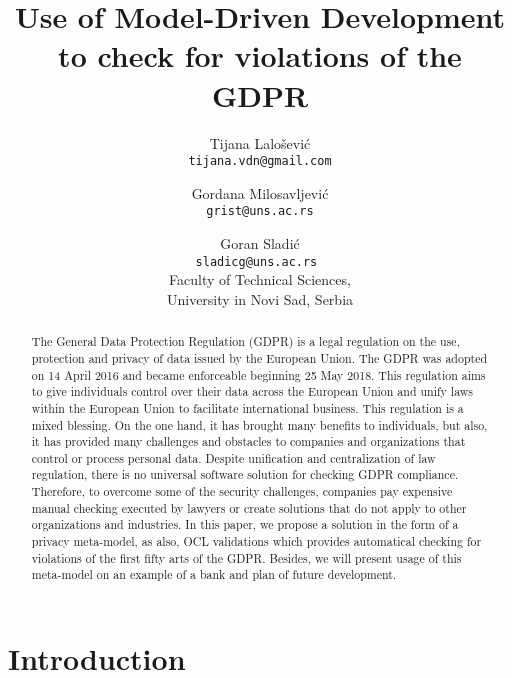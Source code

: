\documentclass[11pt,english]{article}
\begin{document}
\title{Use of Model-Driven Development to check for violations of the GDPR}
\author{
  Tijana Lalošević\\
  \texttt{tijana.vdn@gmail.com}
  \and
  Gordana Milosavljević\\
  \texttt{grist@uns.ac.rs}
  \and
  Goran Sladić\\
  \texttt{sladicg@uns.ac.rs }
  \\Faculty of Technical Sciences,\\ University in Novi Sad, Serbia
}


\date{}
\maketitle


\begin{abstract}
The General Data Protection Regulation (GDPR) is a legal regulation on the use, protection and privacy of data issued by the European Union. The GDPR was adopted on 14 April 2016 and became enforceable beginning 25 May 2018. \cite{gdpr} This regulation aims to give individuals control over their data across the European Union and unify laws within the European Union to facilitate international business. This regulation is a mixed blessing. On the one hand, it has brought many benefits to individuals, but also, it has provided many challenges and obstacles to companies and organizations that control or process personal data. Despite unification and centralization of law regulation, there is no universal software solution for checking GDPR compliance. Therefore, to overcome some of the security challenges, companies pay expensive manual checking executed by lawyers or create solutions that do not apply to other organizations and industries. In this paper, we propose a solution in the form of a privacy meta-model, as also, OCL validations \cite{ocl} which provides automatical checking for violations of the first fifty arts of the GDPR. Besides, we will present usage of this meta-model on an example of a bank and plan of future development.
\end{abstract}

\section{Introduction}
\end{document}
